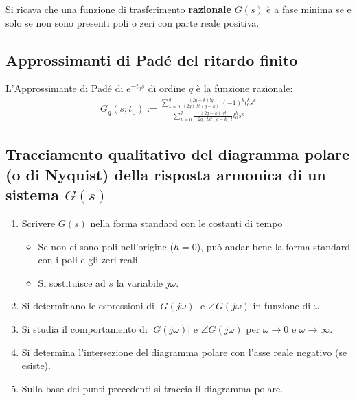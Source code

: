 Si ricava che una funzione di trasferimento \textbf{razionale} $G(s)$ è a fase
minima se e solo se non sono presenti poli o zeri con parte reale positiva.



\subsection{Approssimanti di Padé del ritardo finito}

L'Approssimante di Padé di $e^{-t_0 s}$ di ordine $q$ è la funzione razionale:
\begin{align}
    G_q (s; t_0) := \frac{
        \sum_{k=0}^q \frac{(2q - k)! q!}{(2q)!k!(q-k)!} (-1)^k t_0^k s^k
    }{
        \sum_{k=0}^q \frac{(2q - k)! q!}{(2q)!k!(q-k)!} t_0^k s^k
    }
\end{align}


\subsection{Tracciamento qualitativo del diagramma polare (o di Nyquist) della risposta armonica di un sistema $G(s)$}
\begin{enumerate}
    \item Scrivere $G(s)$ nella forma standard con le costanti di tempo
        \begin{itemize}
            \item Se non ci sono poli nell'origine ($h=0$), può andar bene la forma
                standard con i poli e gli zeri reali.
            \item Si sostituisce ad $s$ la variabile $j\omega$.
        \end{itemize}
    \item Si determinano le espressioni di $|G(j\omega)|$ e $\angle G(j\omega)$
        in funzione di $\omega$.
        
    \item Si studia il comportamento di $|G(j\omega)|$ e $\angle G(j\omega)$
        per $\omega \to 0$ e $\omega \to \infty$.
    
    \item Si determina l'intersezione del diagramma polare con l'asse reale negativo
        (se esiste).
        
    \item Sulla base dei punti precedenti si traccia il diagramma polare.
\end{enumerate}